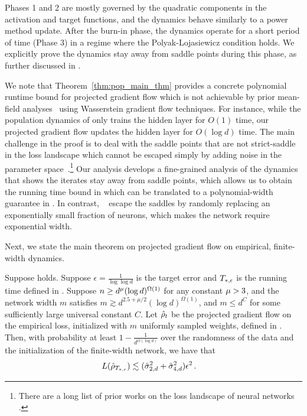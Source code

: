 Phases 1 and 2 are mostly governed by the quadratic components in the activation and target functions, and the dynamics behave similarly to a power method update. 
After the burn-in phase, the dynamics operate for a short period of time (Phase 3) in a regime where the Polyak-Lojasiewicz condition holds. We explicitly prove the dynamics stay away from saddle points during this phase, as further discussed in .

We note that Theorem~\ref{thm:pop_main_thm} provides a concrete polynomial runtime bound for projected gradient flow which is not achievable by prior mean-field analyses~\citep{chizat2018global, mei2018mean, abbe2022merged} using Wasserstein gradient flow techniques. For instance, while the population dynamics of \citet{abbe2022merged} only trains the hidden layer for $O(1)$ time, our projected gradient flow updates the hidden layer for $O(\log d)$ time. The main challenge in the proof is to deal with the saddle points that are not strict-saddle~\citep{ge2015escaping} in the loss landscape which cannot be escaped simply by adding noise in the parameter space~\citep{jin2021nonconvex, lee2016gradient, daneshmand2018escaping}.\footnote{There are a long list of prior works on the loss landscape of neural networks \citep{mei2018landscape, soltanolkotabi2017learning, vardi2021learning, kakade2011efficient,bietti2022learning, ben2020algorithmic, arous2021online,soudry2016no, tian2017analytical,ge2017learning,zhang2019learning,brutzkus2017globally}.}
Our analysis develops a fine-grained analysis of the dynamics that shows the iterates stay away from saddle points, which allows us to obtain the running time bound in  which can be translated to a polynomial-width guarantee in . In contrast, ~\citet{wei2019regularization} escape the saddles by randomly replacing an exponentially small fraction of neurons, which makes the network require exponential width.

Next, we state the main theorem on projected gradient flow on empirical, finite-width dynamics. 
\begin{theorem}\label{thm:empirical-main}
Suppose  holds. Suppose $\epsilon = \frac{1}{\log \log d}$ is the target error and $T_{*, \epsilon}$ is the running time defined in . Suppose $n \geq d^{\mu} (\log d)^{\Omega(1)}$ for any constant $\mu > 3$, and the network width $m$ satisfies $m \gtrsim d^{2.5 + \mu/2} (\log d)^{\Omega(1)}$, and $m \leq d^C$ for some sufficiently large universal constant $C$. Let ${\hat{\rho}}_t$ be the projected gradient flow on the empirical loss, initialized with $m$ uniformly sampled weights, defined in . Then, with probability at least $1 - \frac{1}{d^{\Omega(\log d)}}$ over the randomness of the data and the initialization of the finite-width network, we have that
\begin{align}
L({\hat{\rho}}_{T_{*, \epsilon}})
& \lesssim (\hat{\sigma}_{2, d}^2 + \hat{\sigma}_{4, d}^2) \epsilon^2 \,. \label{eqn:thm_finite_sample}
\end{align}
\end{theorem}


